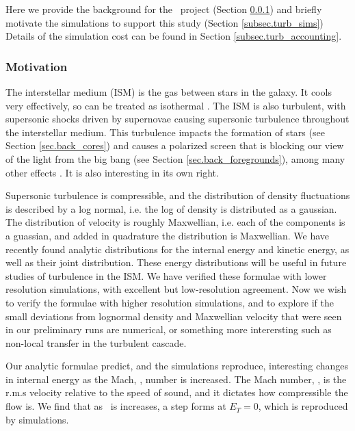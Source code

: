 Here we provide the background for the \nameTurbulence\ project (Section
\ref{subsec.turb_motivate})
and briefly motivate the simulations to support this study (Section
\ref{subsec.turb_sims})  Details of the
simulation cost can be found in Section \ref{subsec.turb_accounting}.


\subsubsection{Motivation}
\label{subsec.turb_motivate}

The interstellar medium (ISM) is the gas between stars in the galaxy.  It cools
very effectively, so can be treated as isothermal .  The ISM is also turbulent, with supersonic shocks driven by supernovae
causing supersonic turbulence throughout the interstellar medium.  This
turbulence impacts the formation of stars (see Section \ref{sec.back_cores}) and
causes a polarized screen that is blocking our view of the light from the big bang (see
Section \ref{sec.back_foregrounds}), among many other effects
\citep{Elmegreen04}. It is also interesting in its own right.

Supersonic turbulence is compressible, and the distribution of density
fluctuations is described by a log normal, i.e. the log of density is
distributed as a gaussian.  The distribution of velocity is roughly Maxwellian,
i.e. each of the components is a guassian, and added in quadrature the
distribution is Maxwellian.  
We have recently found analytic distributions for the internal energy and
kinetic energy, as well as their joint
distribution.   These energy distributions will be useful
in future studies of turbulence in the ISM.  We have verified these formulae 
with lower resolution simulations, with excellent but low-resolution agreement.
Now we wish to verify the formulae with higher resolution simulations, and to
explore if the small deviations from lognormal density and Maxwellian velocity
that were seen in our preliminary runs are numerical, or something more
interersting such as non-local transfer in the turbulent cascade.

Our analytic formulae predict, and the simulations reproduce, interesting
changes in internal energy as the Mach, \mach, number is increased.
The Mach number, \mach, is the r.m.s velocity relative to the speed
of sound, and it dictates how compressible the flow is.  We find that as \mach\
is increases, a step forms at $E_T = 0$, which is reproduced by simulations.



